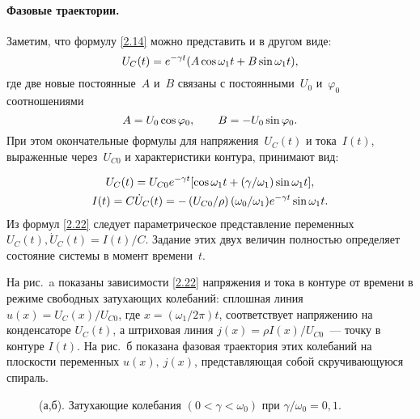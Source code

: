 \paragraph{Фазовые траектории.}
Заметим, что формулу \eqref{2.14} можно представить и в другом виде:
\begin{equation}\eqmark{2.20}
U_C(t)=e^{-\gamma t}(A\cos\omega_1 t+B\sin\omega_1 t),
\end{equation}
где две новые постоянные~$A$ и~$B$ связаны с постоянными~$U_0$ и~$\varphi_0$
соотношениями
\begin{equation}\eqmark{2.21}
A=U_0\cos\varphi_0, \qquad B=-U_0\sin\varphi_0.
\end{equation}
При этом окончательные формулы для напряжения~$U_C(t)$ и тока~$I(t)$, выраженные
через~$U_{C0}$ и характеристики контура, принимают вид:

\begin{equation}
	\eqmark{2.22}
		\begin{gathered}[c]
			U_C(t)=U_{C0}e^{-\gamma
t}[\cos\omega_1t+(\gamma/\omega_1)\sin\omega_1t], \\
			I(t)=C\dot{U}_C(t)
=-\left(U_{C0}/\rho\right)(\omega_0/\omega_1)e^{-\gamma t}\sin\omega_1t.
		\end{gathered}
\end{equation}
Из формул \eqref{2.22} следует параметрическое представление
 переменных $U_C(t),
\dot{U}_C(t)=I(t)/C$. Задание этих двух величин полностью определяет состояние
системы в момент времени~$t$.

На рис.~a показаны 
зависимости \eqref{2.22} напряжения и тока в контуре от времени в режиме
свободных затухающих колебаний: сплошная линия $u(x)=U_C(x)/U_{C0}$, где
$x=(\omega_1/2\pi)t$, соответствует напряжению на конденсаторе $U_C(t)$, а
штриховая линия $j(x)=\rho I(x)/U_{C0}$~--- точку в контуре $I(t)$. На
рис.~б показана фазовая траектория этих колебаний на плоскости
переменных   $u(x),~j(x)$, представляющая собой скручивающуюся спираль.

\begin{figure}[h]
	\begin{minipage}[h]{0.5\linewidth}
	\end{minipage}
	\hfill
	\begin{minipage}[h]{0.5\linewidth}
	\end{minipage}
	\caption{(а,б). Затухающие колебания $(0<\gamma<\omega_0)$ при
$\gamma/\omega_0=0,1$.}
\end{figure}


